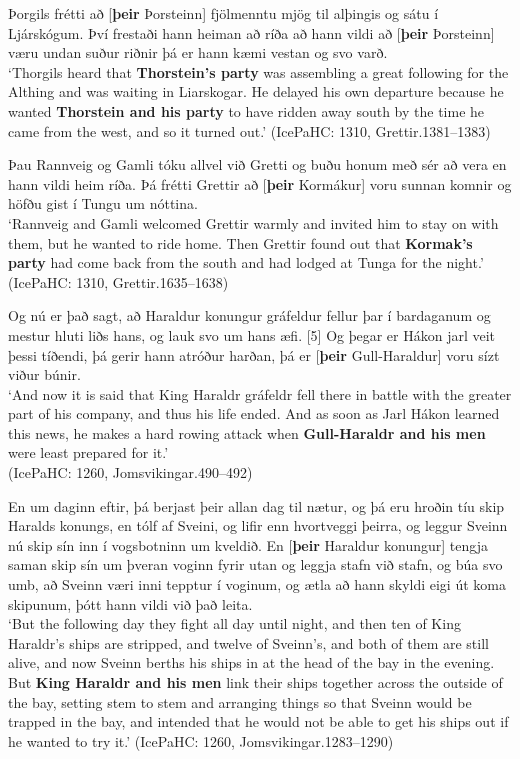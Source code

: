 \documentclass[output=paper,colorlinks,citecolor=brown]{langscibook}
\begin{document}
\begin{exe}
    \ex \label{old-assoc}  %
    \begin{xlist}
        \ex Þorgils frétti að [\textbf{þeir} Þorsteinn] fjölmenntu mjög til alþingis og sátu í Ljárskógum. Því frestaði hann heiman að ríða að hann vildi að [\textbf{þeir} Þorsteinn] væru undan suður riðnir þá er hann kæmi vestan og svo varð. \\
        `Thorgils heard that \textbf{Thorstein's party} was assembling a great following for the Althing and was waiting in Liarskogar. He delayed his own departure because he wanted \textbf{Thorstein and his party} to have ridden away south by the time he came from the west, and so it turned out.' (IcePaHC: 1310, Grettir.1381--1383) 
        
        \ex Þau Rannveig og Gamli tóku allvel við Gretti og buðu honum með sér að vera en hann vildi heim ríða. Þá frétti Grettir að [\textbf{þeir} Kormákur] voru sunnan komnir og höfðu gist í Tungu um nóttina.\\ 
        `Rannveig and Gamli welcomed Grettir warmly and invited him to stay on with them, but he wanted to ride home. Then Grettir found out that \textbf{Kormak's party} had come back from the south and had lodged at Tunga for the night.' (IcePaHC: 1310, Grettir.1635--1638) 
        
        \ex Og nú er það sagt, að Haraldur konungur gráfeldur fellur þar í bardaganum og mestur hluti liðs hans, og lauk svo um hans æfi. [5]  
        Og þegar er Hákon jarl veit þessi tíðendi, þá gerir hann atróður harðan, þá er [\textbf{þeir} Gull-Haraldur] voru sízt viður búnir.\\
        `And now it is said that King Haraldr gráfeldr fell there in battle with the greater part of his company, and thus his life ended. And as soon as Jarl Hákon learned this news, he makes a hard rowing attack when \textbf{Gull-Haraldr and his men} were least prepared for it.' \\
        (IcePaHC: 1260, Jomsvikingar.490--492)
        
        \ex En um daginn eftir, þá berjast þeir allan dag til nætur, og þá eru hroðin tíu skip Haralds konungs, en tólf af Sveini, og lifir enn hvortveggi þeirra, og leggur Sveinn nú skip sín inn í vogsbotninn um kveldið. En [\textbf{þeir} Haraldur konungur] tengja saman skip sín um þveran voginn fyrir utan og leggja stafn við stafn, og búa svo umb, að Sveinn væri inni tepptur í voginum, og ætla að hann skyldi eigi út koma skipunum, þótt hann vildi við það leita.\\ 
        `But the following day they fight all day until night, and then ten of King Haraldr's ships are stripped, and twelve of Sveinn's, and both of them are still alive, and now Sveinn berths his ships in at the head of the bay in the evening. But \textbf{King Haraldr and his men} link their ships together across the outside of the bay, setting stem to stem and arranging things so that Sveinn would be trapped in the bay, and intended that he would not be able to get his ships out if he wanted to try it.' (IcePaHC: 1260, Jomsvikingar.1283--1290)


\end{xlist}
\end{exe}
\end{document}
